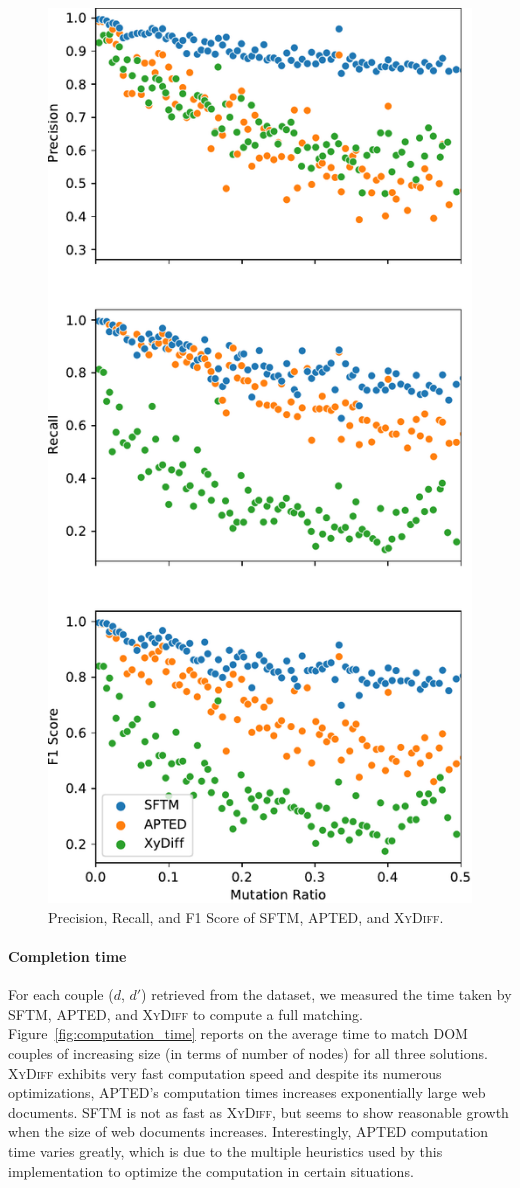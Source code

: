 \begin{figure}
  \centering
  \includegraphics[width=.65\linewidth]{tree-matching/graphs/f1score}
  \caption{Precision, Recall, and F1 Score of SFTM, APTED, and \textsc{XyDiff}.}
  \label{fig:f1score}
\end{figure}

\paragraph{Completion time}
For each couple ($d$, $d'$) retrieved from the dataset, we measured the time taken by SFTM, APTED, and \textsc{XyDiff} to compute a full matching.
Figure~\ref{fig:computation_time} reports on the average time to match DOM couples of increasing size (in terms of number of nodes) for all three solutions.
\textsc{XyDiff} exhibits very fast computation speed and despite its numerous optimizations, APTED's computation times increases exponentially large web documents.
SFTM is not as fast as \textsc{XyDiff}, but seems to show reasonable growth when the size of web documents increases.
Interestingly, APTED computation time varies greatly, which is due to the multiple heuristics used by this implementation to optimize the computation in certain situations.


